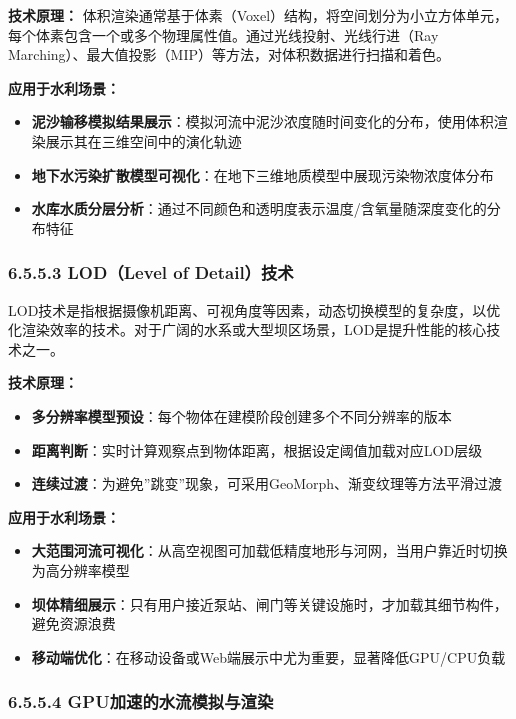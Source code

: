 \textbf{技术原理：}
体积渲染通常基于体素（Voxel）结构，将空间划分为小立方体单元，每个体素包含一个或多个物理属性值。通过光线投射、光线行进（Ray
Marching）、最大值投影（MIP）等方法，对体积数据进行扫描和着色。

\textbf{应用于水利场景：}

\begin{itemize}
\tightlist
\item
  \textbf{泥沙输移模拟结果展示}：模拟河流中泥沙浓度随时间变化的分布，使用体积渲染展示其在三维空间中的演化轨迹
\item
  \textbf{地下水污染扩散模型可视化}：在地下三维地质模型中展现污染物浓度体分布
\item
  \textbf{水库水质分层分析}：通过不同颜色和透明度表示温度/含氧量随深度变化的分布特征
\end{itemize}

\subsubsection{6.5.5.3 LOD（Level of
Detail）技术}\label{lodlevel-of-detailux6280ux672f}

LOD技术是指根据摄像机距离、可视角度等因素，动态切换模型的复杂度，以优化渲染效率的技术。对于广阔的水系或大型坝区场景，LOD是提升性能的核心技术之一。

\textbf{技术原理：}

\begin{itemize}
\tightlist
\item
  \textbf{多分辨率模型预设}：每个物体在建模阶段创建多个不同分辨率的版本
\item
  \textbf{距离判断}：实时计算观察点到物体距离，根据设定阈值加载对应LOD层级
\item
  \textbf{连续过渡}：为避免''跳变''现象，可采用GeoMorph、渐变纹理等方法平滑过渡
\end{itemize}

\textbf{应用于水利场景：}

\begin{itemize}
\tightlist
\item
  \textbf{大范围河流可视化}：从高空视图可加载低精度地形与河网，当用户靠近时切换为高分辨率模型
\item
  \textbf{坝体精细展示}：只有用户接近泵站、闸门等关键设施时，才加载其细节构件，避免资源浪费
\item
  \textbf{移动端优化}：在移动设备或Web端展示中尤为重要，显著降低GPU/CPU负载
\end{itemize}

\subsubsection{6.5.5.4
GPU加速的水流模拟与渲染}\label{gpuux52a0ux901fux7684ux6c34ux6d41ux6a21ux62dfux4e0eux6e32ux67d3}

